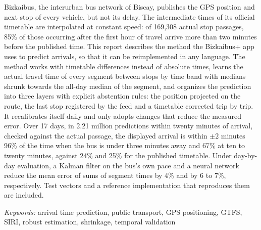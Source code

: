 \noindent Bizkaibus, the interurban bus network of Biscay, publishes the GPS position and next stop of every
vehicle, but not its delay. The intermediate times of its official timetable are interpolated at constant speed:
of 169,308 actual stop passages, 85\% of those occurring after the first hour of travel arrive more than two minutes
before the published time. This report describes the method the Bizkaibus+ app uses to predict arrivals, so that it
can be reimplemented in any language. The method works with timetable differences instead of absolute times, learns the
actual travel time of every segment between stops by time band with medians shrunk towards the all-day median of the
segment, and organizes the prediction into three layers with explicit abstention rules: the position projected on the
route, the last stop registered by the feed and a timetable corrected trip by trip. It recalibrates itself daily and only adopts
changes that reduce the measured error. Over 17 days, in 2.21 million predictions within twenty minutes of arrival,
checked against the actual passage, the displayed arrival is within $\pm2$ minutes 96\% of the time when the bus is under three
minutes away and 67\% at ten to twenty minutes, against 24\% and 25\% for the published timetable. Under day-by-day
evaluation, a Kalman filter on the bus's own pace and a neural network reduce the mean error of sums of segment times by
4\% and by 6 to 7\%, respectively. Test vectors and a reference implementation that reproduces them are included.

\textit{Keywords:} arrival time prediction, public transport, GPS positioning, GTFS, SIRI, robust estimation,
shrinkage, temporal validation

